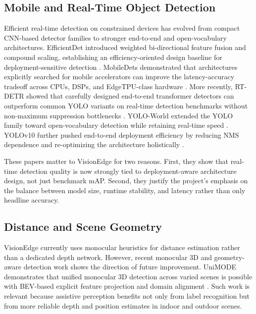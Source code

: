 \documentclass[conference]{IEEEtran}
\begin{document}
\subsection{Mobile and Real-Time Object Detection}
Efficient real-time detection on constrained devices has evolved from compact CNN-based detector families to stronger end-to-end and open-vocabulary architectures. EfficientDet introduced weighted bi-directional feature fusion and compound scaling, establishing an efficiency-oriented design baseline for deployment-sensitive detection \cite{tan2020efficientdet}. MobileDets demonstrated that architectures explicitly searched for mobile accelerators can improve the latency-accuracy tradeoff across CPUs, DSPs, and EdgeTPU-class hardware \cite{xiong2021mobiledets}. More recently, RT-DETR showed that carefully designed end-to-end transformer detectors can outperform common YOLO variants on real-time detection benchmarks without non-maximum suppression bottlenecks \cite{zhao2024rtdetr}. YOLO-World extended the YOLO family toward open-vocabulary detection while retaining real-time speed \cite{cheng2024yoloworld}. YOLOv10 further pushed end-to-end deployment efficiency by reducing NMS dependence and re-optimizing the architecture holistically \cite{wang2024yolov10}.

These papers matter to VisionEdge for two reasons. First, they show that real-time detection quality is now strongly tied to deployment-aware architecture design, not just benchmark mAP. Second, they justify the project's emphasis on the balance between model size, runtime stability, and latency rather than only headline accuracy.

\subsection{Distance and Scene Geometry}
VisionEdge currently uses monocular heuristics for distance estimation rather than a dedicated depth network. However, recent monocular 3D and geometry-aware detection work shows the direction of future improvement. UniMODE demonstrates that unified monocular 3D detection across varied scenes is possible with BEV-based explicit feature projection and domain alignment \cite{li2024unimode}. Such work is relevant because assistive perception benefits not only from label recognition but from more reliable depth and position estimates in indoor and outdoor scenes.
\end{document}
